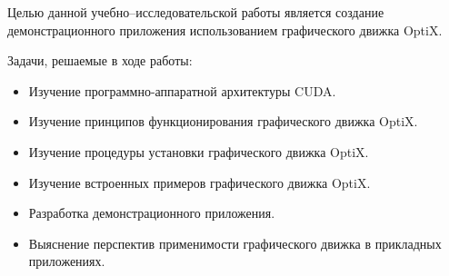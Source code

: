 Целью данной учебно--исследовательской работы является создание демонстрационного приложения использованием графического движка OptiX.

Задачи, решаемые в ходе работы:
\begin{itemize}
\item Изучение  программно-аппаратной архитектуры CUDA.
\item Изучение принципов функционирования графического движка OptiX.
\item Изучение процедуры установки графического движка OptiX.
\item Изучение встроенных примеров графического движка OptiX.
\item Разработка демонстрационного приложения.
\item Выяснение перспектив применимости графического движка в прикладных приложениях.
\end{itemize}
